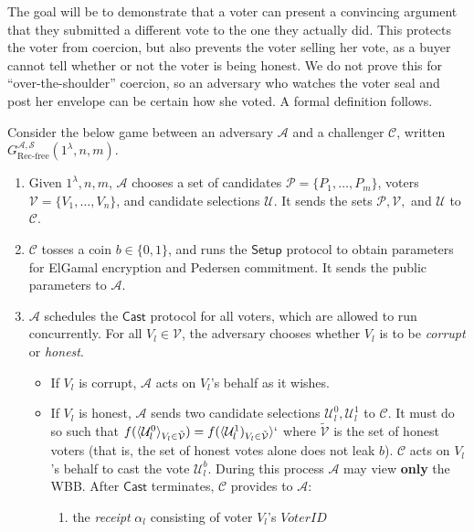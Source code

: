 \documentclass[12pt,a4paper]{article}
\theoremstyle{definition}
\newcommand{\VoterID}{\mathit{VoterID}}
\begin{document}
The goal will be to demonstrate that a voter can present a convincing argument that they submitted a different vote to the one they actually did. This protects the voter from coercion, but also prevents the voter selling her vote, as a buyer cannot tell whether or not the voter is being honest. We do not prove this for ``over-the-shoulder'' coercion, so an adversary who watches the voter seal and post her envelope can be certain how she voted. A formal definition follows.
\newpage
\begin{definition}
    Consider the below game between an adversary $\mathcal{A}$ and a challenger $\mathcal{C}$, written $G_{\text{Rec-free}}^{\mathcal{A},\mathcal{S}}(1^\lambda, n, m)$.
    \begin{enumerate}
        \item Given $1^\lambda, n, m$, $\mathcal{A}$ chooses a set of candidates $\mathcal{P}=\{P_1,\ldots,P_m\}$, voters $\mathcal{V}=\{V_1,\ldots,V_n\}$, and candidate selections $\mathcal{U}$. It sends the sets $\mathcal{P}, \mathcal{V},$ and $\mathcal{U}$ to $\mathcal{C}$.
        \item $\mathcal{C}$ tosses a coin $b\in\{0, 1\}$, and runs the $\mathsf{Setup}$ protocol to obtain parameters for ElGamal encryption and Pedersen commitment. It sends the public parameters to $\mathcal{A}$.
        \item $\mathcal{A}$ schedules the $\mathsf{Cast}$ protocol for all voters, which are allowed to run concurrently. For all $V_l\in\mathcal{V}$, the adversary chooses whether $V_l$ is to be \textit{corrupt} or \textit{honest}.
        \begin{itemize}
            \item If $V_l$ is corrupt, $\mathcal{A}$ acts on $V_l$'s behalf as it wishes.
            \item If $V_l$ is honest, $\mathcal{A}$ sends two candidate selections $\mathcal{U}_l^0, \mathcal{U}_l^1$ to $\mathcal{C}$. It must do so such that $f(\langle\mathcal{U}_l^0\rangle_{V_l\in \tilde{\mathcal{V}}})=f(\langle\mathcal{U}^1_l)_{V_l\in \tilde{\mathcal{V}}}\rangle`$ where $\tilde{\mathcal{V}}$ is the set of honest voters (that is, the set of honest votes alone does not leak $b$). $\mathcal{C}$ acts on $V_l$'s behalf to cast the vote $\mathcal{U}_l^b$. During this process $\mathcal{A}$ may view \textbf{only} the WBB. After $\mathsf{Cast}$ terminates, $\mathcal{C}$ provides to $\mathcal{A}$:
            \begin{enumerate}
                \item the \textit{receipt} $\alpha_l$ consisting of voter $V_l$'s $\VoterID$

\end{enumerate}
\end{itemize}
\end{enumerate}
\end{definition}
\end{document}
